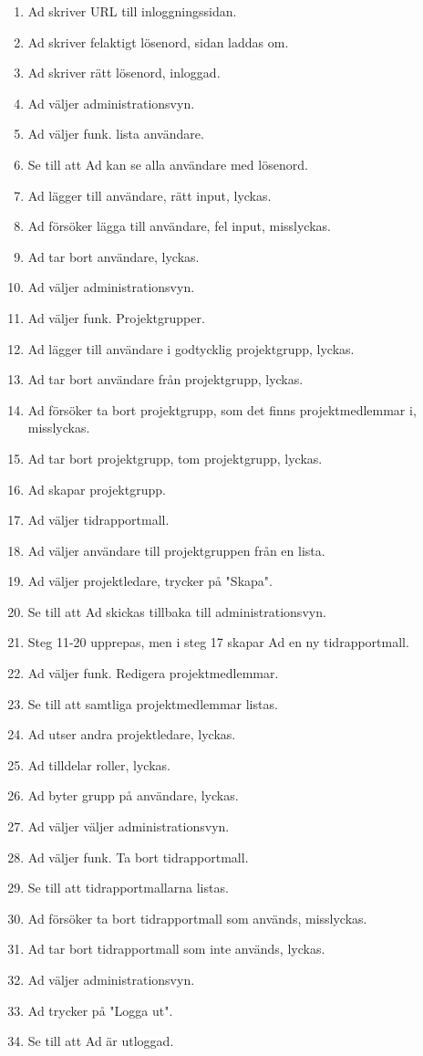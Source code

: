 \documentclass[a4paper]{article}
\begin{document}
\begin{FT}
\begin{enumerate}
\item Ad skriver URL till inloggningssidan.
\item Ad skriver felaktigt lösenord, sidan laddas om.
\item Ad skriver rätt lösenord, inloggad.
\item Ad väljer administrationsvyn.
\item Ad väljer funk. lista användare.
\item Se till att Ad kan se alla användare med lösenord.
\item Ad lägger till användare, rätt input, lyckas.
\item Ad försöker lägga till användare, fel input, misslyckas.
\item Ad tar bort användare, lyckas.
\item Ad väljer administrationsvyn.
\item Ad väljer funk. Projektgrupper.
\item Ad lägger till användare i godtycklig projektgrupp, lyckas.
\item Ad tar bort användare från projektgrupp, lyckas.
\item Ad försöker ta bort projektgrupp, som det finns projektmedlemmar i, misslyckas.
\item Ad tar bort projektgrupp, tom projektgrupp, lyckas.
\item Ad skapar projektgrupp.
\item Ad väljer tidrapportmall.
\item Ad väljer användare till projektgruppen från en lista.
\item Ad väljer projektledare, trycker på "Skapa".
\item Se till att Ad skickas tillbaka till administrationsvyn.
\item Steg 11-20 upprepas, men i steg 17 skapar Ad en ny tidrapportmall.
\item Ad väljer funk. Redigera projektmedlemmar.
\item Se till att samtliga projektmedlemmar listas.
\item Ad utser andra projektledare, lyckas.
\item Ad tilldelar roller, lyckas.
\item Ad byter grupp på användare, lyckas.
\item Ad väljer väljer administrationsvyn.
\item Ad väljer funk. Ta bort tidrapportmall.
\item Se till att tidrapportmallarna listas.
\item Ad försöker ta bort tidrapportmall som används, misslyckas.
\item Ad tar bort tidrapportmall som inte används, lyckas.
\item Ad väljer administrationsvyn.
\item Ad trycker på "Logga ut".
\item Se till att Ad är utloggad.


\end{enumerate}
\end{FT}
\end{document}
